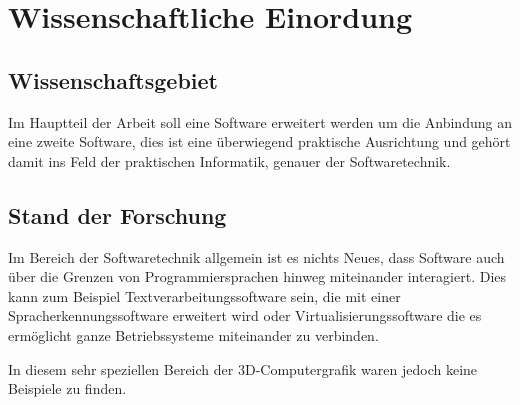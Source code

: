\section{Wissenschaftliche Einordung}

\subsection{Wissenschaftsgebiet}
Im Hauptteil der Arbeit soll eine Software erweitert werden um die Anbindung an eine zweite Software, dies ist eine überwiegend praktische Ausrichtung und gehört damit ins Feld der praktischen Informatik, genauer der Softwaretechnik.

\subsection{Stand der Forschung}
Im Bereich der Softwaretechnik allgemein ist es nichts Neues, dass Software auch über die Grenzen von Programmiersprachen hinweg miteinander interagiert. Dies kann zum Beispiel Textverarbeitungssoftware sein, die mit einer Spracherkennungssoftware erweitert wird oder Virtualisierungssoftware die es ermöglicht ganze Betriebssysteme miteinander zu verbinden.

In diesem sehr speziellen Bereich der 3D-Computergrafik waren jedoch keine Beispiele zu finden.
